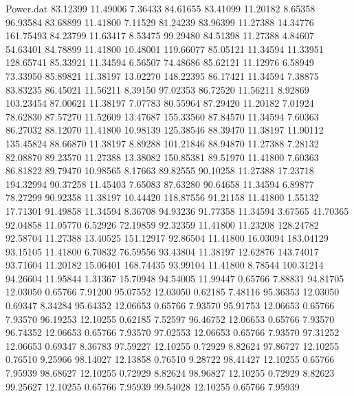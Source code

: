 \begin{filecontents}{Power.dat}
  83.12399   11.49006    7.36433   84.61655
  83.41099   11.20182    8.65358   96.93584
  83.68899   11.41800    7.11529   81.24239
  83.96399   11.27388   14.34776  161.75493
  84.23799   11.63417    8.53475   99.29480
  84.51398   11.27388    4.84607   54.63401
  84.78899   11.41800   10.48001  119.66077
  85.05121   11.34594   11.33951  128.65741
  85.33921   11.34594    6.56507   74.48686
  85.62121   11.12976    6.58949   73.33950
  85.89821   11.38197   13.02270  148.22395
  86.17421   11.34594    7.38875   83.83235
  86.45021   11.56211    8.39150   97.02353
  86.72520   11.56211    8.92869  103.23454
  87.00621   11.38197    7.07783   80.55964
  87.29420   11.20182    7.01924   78.62830
  87.57270   11.52609   13.47687  155.33560
  87.84570   11.34594    7.60363   86.27032
  88.12070   11.41800   10.98139  125.38546
  88.39470   11.38197   11.90112  135.45824
  88.66870   11.38197    8.89288  101.21846
  88.94870   11.27388    7.28132   82.08870
  89.23570   11.27388   13.38082  150.85381
  89.51970   11.41800    7.60363   86.81822
  89.79470   10.98565    8.17663   89.82555
  90.10258   11.27388   17.23718  194.32994
  90.37258   11.45403    7.65083   87.63280
  90.64658   11.34594    6.89877   78.27299
  90.92358   11.38197   10.44420  118.87556
  91.21158   11.41800    1.55132   17.71301
  91.49858   11.34594    8.36708   94.93236
  91.77358   11.34594    3.67565   41.70365
  92.04858   11.05770    6.52926   72.19859
  92.32359   11.41800   11.23208  128.24782
  92.58704   11.27388   13.40525  151.12917
  92.86504   11.41800   16.03094  183.04129
  93.15105   11.41800    6.70832   76.59556
  93.43804   11.38197   12.62876  143.74017
  93.71604   11.20182   15.06401  168.74435
  93.99104   11.41800    8.78544  100.31214
  94.26604   11.95844    1.31367   15.70948
  94.54005   11.99447    0.65766    7.88831
  94.81705   12.03050    0.65766    7.91200
  95.07552   12.03050    0.62185    7.48116
  95.36353   12.03050    0.69347    8.34284
  95.64352   12.06653    0.65766    7.93570
  95.91753   12.06653    0.65766    7.93570
  96.19253   12.10255    0.62185    7.52597
  96.46752   12.06653    0.65766    7.93570
  96.74352   12.06653    0.65766    7.93570
  97.02553   12.06653    0.65766    7.93570
  97.31252   12.06653    0.69347    8.36783
  97.59227   12.10255    0.72929    8.82624
  97.86727   12.10255    0.76510    9.25966
  98.14027   12.13858    0.76510    9.28722
  98.41427   12.10255    0.65766    7.95939
  98.68627   12.10255    0.72929    8.82624
  98.96827   12.10255    0.72929    8.82623
  99.25627   12.10255    0.65766    7.95939
  99.54028   12.10255    0.65766    7.95939

\end{filecontents}
